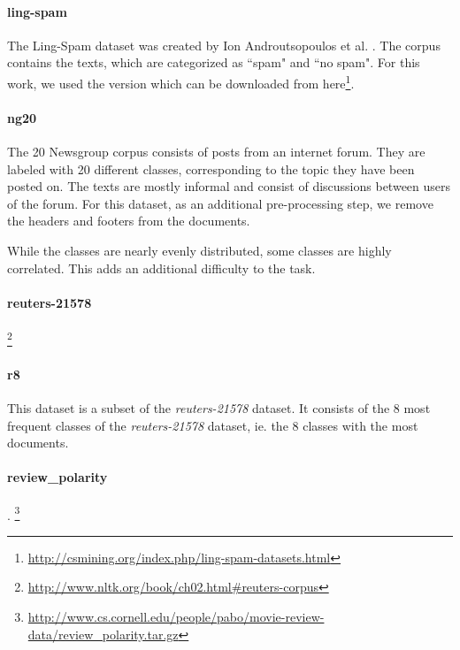 
\paragraph{ling-spam}
The Ling-Spam dataset was created by Ion Androutsopoulos et al. \cite{Androutsopoulos2000}.
The corpus contains the texts, which are categorized as ``spam" and ``no spam". For this work, we used the version which can be downloaded from here\footnote{\url{http://csmining.org/index.php/ling-spam-datasets.html}}.

\paragraph{ng20}
The 20 Newsgroup corpus \cite{Lang} consists of posts from an internet forum. They are labeled with 20 different classes, corresponding to the topic they have been posted on. The texts are mostly informal and consist of discussions between users of the forum.
For this dataset, as an additional pre-processing step, we remove the headers and footers from the documents.

While the classes are nearly evenly distributed, some classes are highly correlated. This adds an additional difficulty to the task.


\paragraph{reuters-21578}
\footnote{\url{http://www.nltk.org/book/ch02.html#reuters-corpus}}

\paragraph{r8}
This dataset is a subset of the \textit{reuters-21578} dataset.
It consists of the 8 most frequent classes of the \textit{reuters-21578} dataset, ie. the 8 classes with the most documents.

\paragraph{review\_polarity}
\cite{Pang2004}.
\footnote{\url{http://www.cs.cornell.edu/people/pabo/movie-review-data/review_polarity.tar.gz}}

